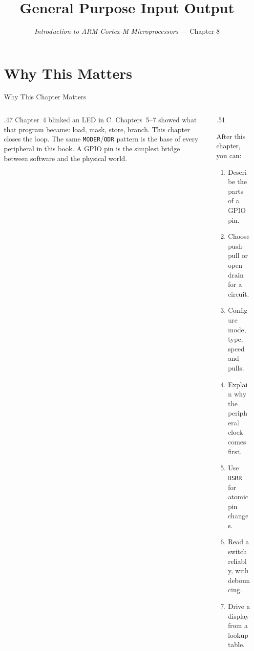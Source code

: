 \documentclass[9pt,aspectratio=169,xcolor=table]{beamer}
\title{General Purpose Input Output}
\subtitle{\emph{Introduction to ARM Cortex-M Microprocessors} --- Chapter 8}
\begin{document}
\titlepage

\section{Why This Matters}

\begin{frame}{Why This Chapter Matters}
    \begin{columns}[T]
    \begin{column}{.47\textwidth}
        {\normalsize Chapter~4 blinked an LED in C. Chapters~5--7 showed what that program became: load, mask, store, branch. This chapter closes the loop. The same \texttt{MODER}/\texttt{ODR} pattern is the base of every peripheral in this book. A GPIO pin is the simplest bridge between software and the physical world.}
    \end{column}
    \begin{column}{.51\textwidth}
        \begin{block}{After this chapter, you can:}
        {\small
        \begin{enumerate}\itemsep2pt
            \item Describe the parts of a GPIO pin.
            \item Choose push-pull or open-drain for a circuit.
            \item Configure mode, type, speed and pulls.
            \item Explain why the peripheral clock comes first.
            \item Use \texttt{BSRR} for atomic pin changes.
            \item Read a switch reliably, with debouncing.
            \item Drive a display from a lookup table.
        \end{enumerate}}
        \end{block}
    \end{column}
    \end{columns}
\end{frame}
\end{document}
